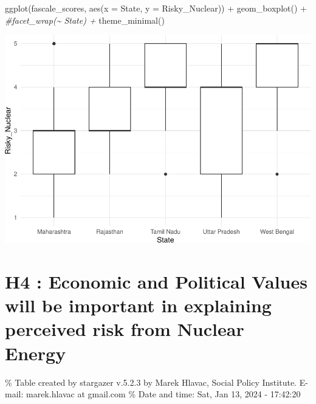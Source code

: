 \documentclass[
]{article}
\newenvironment{Shaded}{\begin{snugshade}}{\end{snugshade}}
\newcommand{\AttributeTok}[1]{\textcolor[rgb]{0.77,0.63,0.00}{#1}}
\newcommand{\CommentTok}[1]{\textcolor[rgb]{0.56,0.35,0.01}{\textit{#1}}}
\newcommand{\FunctionTok}[1]{\textcolor[rgb]{0.00,0.00,0.00}{#1}}
\newcommand{\NormalTok}[1]{#1}
\newcommand{\SpecialCharTok}[1]{\textcolor[rgb]{0.00,0.00,0.00}{#1}}
\begin{document}
\begin{Shaded}
\begin{Highlighting}[]
\FunctionTok{ggplot}\NormalTok{(fascale\_scores, }\FunctionTok{aes}\NormalTok{(}\AttributeTok{x =}\NormalTok{ State, }\AttributeTok{y =}\NormalTok{ Risky\_Nuclear)) }\SpecialCharTok{+}
  \FunctionTok{geom\_boxplot}\NormalTok{() }\SpecialCharTok{+}
  \CommentTok{\#facet\_wrap(\textasciitilde{} State) +}
  \FunctionTok{theme\_minimal}\NormalTok{()}
\end{Highlighting}
\end{Shaded}

\includegraphics{Paper1_files/figure-latex/unnamed-chunk-25-4.pdf}

\newpage

\hypertarget{h4-economic-and-political-values-will-be-important-in-explaining-perceived-risk-from-nuclear-energy}{%
\section{H4 : Economic and Political Values will be important in
explaining perceived risk from Nuclear
Energy}\label{h4-economic-and-political-values-will-be-important-in-explaining-perceived-risk-from-nuclear-energy}}

\begingroup\setlength{\tabcolsep}{1pt}

\renewcommand{\arraystretch}{0.7}

\% Table created by stargazer v.5.2.3 by Marek Hlavac, Social Policy
Institute. E-mail: marek.hlavac at gmail.com \% Date and time: Sat, Jan
13, 2024 - 17:42:20
\end{document}
